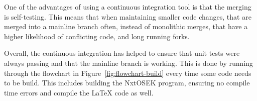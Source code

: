 One of the advantages of using a continuous integration tool is that the merging is self-testing.
This means that when maintaining smaller code changes, that are merged into a mainline branch often, instead of monolithic merges, that have a higher likelihood of conflicting code, and long running forks.

Overall, the continuous integration has helped to ensure that unit tests were always passing and that the mainline branch is working.
This is done by running through the flowchart in Figure~\ref{fig:flowchart-build} every time some code needs to be build.
This includes building the NxtOSEK program, ensuring no compile time errors and compile the \LaTeX{} code as well.
